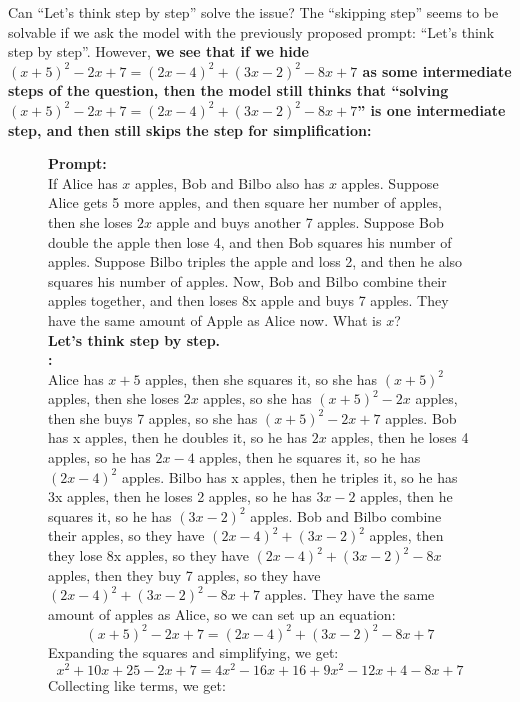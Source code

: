 {Can ``Let's think step by step'' solve the issue?} The ``skipping step'' seems to be solvable if we ask the model with the previously proposed prompt: ``Let's think step by step''. However, \textbf{we see that if we hide $(x + 5)^2 - 2x + 7 = (2x - 4)^2 + (3x - 2)^2 - 8x + 7$ as some intermediate steps of the question, then the model still thinks that ``solving $(x + 5)^2 - 2x + 7 = (2x - 4)^2 + (3x - 2)^2 - 8x + 7$'' is one intermediate step, and then still skips the step for simplification:}
\begin{figure}[H]
\begin{AIbox}{\DV}
{\bf Prompt:} \\
{\scriptsize
If Alice has $x$ apples, Bob and Bilbo also has $x$ apples. Suppose Alice gets 5 more apples, and then square her number of apples, then she loses $2x$ apple and buys another 7 apples. Suppose Bob double the apple then lose 4, and then Bob squares his number of apples. Suppose Bilbo triples the apple and loss 2, and then he also squares his number of apples. Now, Bob and Bilbo combine their apples together, and then loses 8x apple and buys 7 apples. They have the same amount of Apple as Alice now. What is $x$? \\
\textbf{Let's think step by step.}
}\\

{\bf \DV:} \\
{\scriptsize
Alice has $x + 5$ apples, then she squares it, so she has $(x + 5)^2$ apples, then she loses $2x$ apples, so she has $(x + 5)^2 - 2x$ apples, then she buys 7 apples, so she has $(x + 5)^2 - 2x + 7$ apples.
Bob has x apples, then he doubles it, so he has $2x$ apples, then he loses 4 apples, so he has $2x - 4$ apples, then he squares it, so he has $(2x - 4)^2$ apples.
Bilbo has x apples, then he triples it, so he has 3x apples, then he loses 2 apples, so he has $3x - 2$ apples, then he squares it, so he has $(3x - 2)^2$ apples.
Bob and Bilbo combine their apples, so they have $(2x - 4)^2 + (3x - 2)^2$ apples, then they lose 8x apples, so they have $(2x - 4)^2 + (3x - 2)^2 - 8x$ apples, then they buy 7 apples, so they have $(2x - 4)^2 + (3x - 2)^2 - 8x + 7$ apples.
They have the same amount of apples as Alice, so we can set up an equation:
$$(x + 5)^2 - 2x + 7 = (2x - 4)^2 + (3x - 2)^2 - 8x + 7$$
Expanding the squares and simplifying, we get:
$$x^2 + 10x + 25 - 2x + 7 = 4x^2 - 16x + 16 + 9x^2 - 12x + 4 - 8x + 7$$
Collecting like terms, we get:
}
\end{AIbox}
\end{figure}

